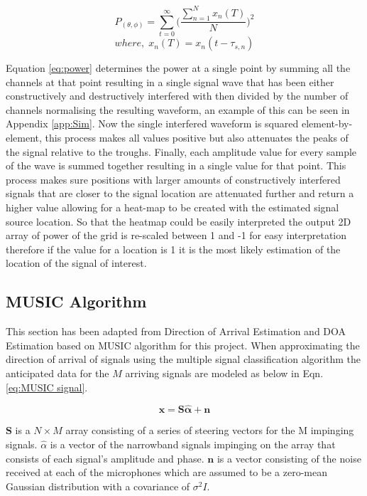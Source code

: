 \documentclass{UoNMCHA}
\numberwithin{equation}{section}
\begin{document}
    \begin{equation}
        P_{(\theta, \phi)} = \sum_{t=0}^\infty\Big(\frac{\sum_{n=1}^N x_n(T)}{N}\Big)^2
        \label{eq:power}
    \end{equation}
    \begin{equation*}
        where,\;x_n(T) = x_n(t-\tau_{s,n})
    \end{equation*}
    
    Equation \ref{eq:power} determines the power at a single point by summing all the channels at that point resulting in a single signal wave that has been either constructively and destructively interfered with then divided by the number of channels normalising the resulting waveform, an example of this can be seen in Appendix \ref{app:Sim}. Now the single interfered waveform is squared element-by-element, this process makes all values positive but also attenuates the peaks of the signal relative to the troughs. Finally, each amplitude value for every sample of the wave is summed together resulting in a single value for that point. This process makes sure positions with larger amounts of constructively interfered signals that are closer to the signal location are attenuated further and return a higher value allowing for a heat-map to be created with the estimated signal source location. So that the heatmap could be easily interpreted the output 2D array of power of the grid is re-scaled between 1 and -1 for easy interpretation therefore if the value for a location is 1 it is the most likely estimation of the location of the signal of interest.
    
\subsection{MUSIC Algorithm} \label{sec:Software MUSIC}
    This section has been adapted from Direction of Arrival Estimation \citep{Adv13} and DOA Estimation based on MUSIC algorithm \citep{Tan14} for this project. When approximating the direction of arrival of signals using the multiple signal classification algorithm the anticipated data for the $M$ arriving signals are modeled as below in Eqn. \ref{eq:MUSIC signal}.
    
    \begin{equation}
        \mathbf{x}=\mathbf{S\hat{\alpha}} + \mathbf{n}
        \label{eq:MUSIC signal}
    \end{equation}

    $\mathbf{S}$ is a $N \times M$ array consisting of a series of steering vectors for the M impinging signals. $\hat{\alpha}$ is a vector of the narrowband signals impinging on the array that consists of each signal's amplitude and phase. $\mathbf{n}$ is a vector consisting of the noise received at each of the microphones which are assumed to be a zero-mean Gaussian distribution with a covariance of $\sigma^2I$.
\end{document}
